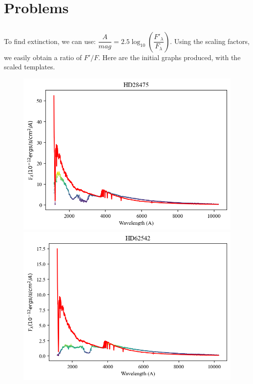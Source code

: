 \documentclass{article}
\begin{document}
    \section{Problems}

    \subsection{}
    To find extinction, we can use: $\dfrac{A}{mag} = 2.5\log_{10}\left(\dfrac{F'_\lambda}{F_\lambda}\right)$.
    Using the scaling factors, we easily obtain a ratio of $F'/F$. Here are the initial graphs produced, with the scaled templates.


    \begin{figure}[H]
        \centering
        \includegraphics[scale = .5]{first.png}
        \includegraphics[scale = .5]{second.png}
    \end{figure}
\end{document}
